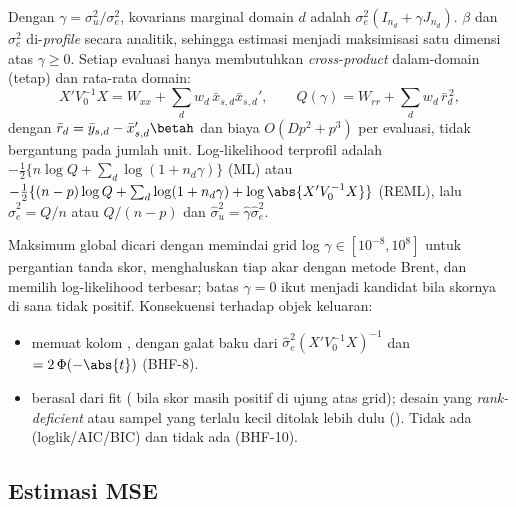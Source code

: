 Dengan $\gamma=\sigma_u^2/\sigma_e^2$, kovarians marginal domain $d$ adalah
$\sigma_e^2(I_{n_d}+\gamma J_{n_d})$. $\beta$ dan $\sigma_e^2$
di-\emph{profile} secara analitik, sehingga estimasi menjadi maksimisasi
satu dimensi atas $\gamma\ge0$. Setiap evaluasi hanya membutuhkan
\emph{cross-product} dalam-domain (tetap) dan rata-rata domain:
\begin{equation}
  X'V_0^{-1}X = W_{xx}+\sum_d w_d\,\bar x_{s,d}\bar x_{s,d}',
  \qquad
  Q(\gamma)=W_{rr}+\sum_d w_d\,\bar r_d^{\,2},
\end{equation}
dengan $\bar r_d=\bar y_{s,d}-\bar x_{s,d}'\betah$ dan biaya $O(Dp^2+p^3)$
per evaluasi, tidak bergantung pada jumlah unit. Log-likelihood terprofil
adalah $-\tfrac12\{n\log Q+\sum_d\log(1+n_d\gamma)\}$ (ML) atau
$-\tfrac12\{(n-p)\log Q+\sum_d\log(1+n_d\gamma)+\log\abs{X'V_0^{-1}X}\}$
(REML), lalu $\hat\sigma_e^2=Q/n$ atau $Q/(n-p)$ dan
$\hat\sigma_u^2=\hat\gamma\hat\sigma_e^2$.

Maksimum global dicari dengan memindai grid log $\gamma\in[10^{-8},10^{8}]$
untuk pergantian tanda skor, menghaluskan tiap akar dengan metode Brent, dan
memilih log-likelihood terbesar; batas $\gamma=0$ ikut menjadi kandidat bila
skornya di sana tidak positif. Konsekuensi terhadap objek keluaran:
\begin{itemize}
  \item {} memuat kolom , dengan galat baku dari
        $\hat\sigma_e^2(X'V_0^{-1}X)^{-1}$ dan 
        $=2\,\Phi(-\abs{t})$ (BHF-8).
  \item {} berasal dari fit ( bila skor masih
        positif di ujung atas grid); desain yang \emph{rank-deficient} atau
        sampel yang terlalu kecil ditolak lebih dulu
        (). Tidak ada 
        (loglik/AIC/BIC) dan tidak ada  (BHF-10).
\end{itemize}

\subsection{Estimasi MSE}\label{sec:bhf-mse}

